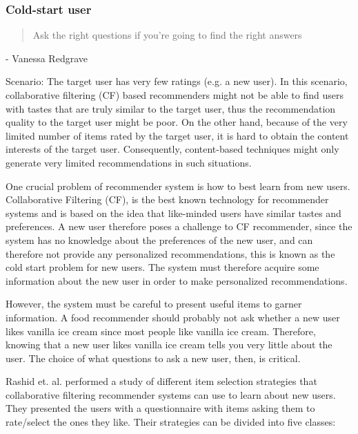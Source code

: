 
\subsubsection{Cold-start user}

\begin{quotation}
Ask the right questions if you're going to find the right answers
\end{quotation}
- Vanessa Redgrave

Scenario: The target user has very few ratings (e.g. a new user). In this
scenario, collaborative filtering (CF) based recommenders might not be able to
find users with tastes that are truly similar to the target user, thus the
recommendation quality to the target user might be poor. On the other hand,
because of the very limited number of items rated by the target user, it is
hard to obtain the content interests of the target user. Consequently,
content-based techniques might only generate very limited recommendations in
such situations.

One crucial problem of recommender system is how to best learn from new users.
Collaborative Filtering (CF), is the best known technology for recommender
systems and is based on the idea that like-minded users have similar tastes and
preferences. A new user therefore poses a challenge to CF recommender, since
the system has no knowledge about the preferences of the new user, and can
therefore not provide any personalized recommendations, this is known as the
cold start problem for new users. The system must therefore acquire some
information about the new user in order to make personalized recommendations.

However, the system must be careful to present useful items to garner
information. A food recommender should probably not ask whether a new user
likes vanilla ice cream since most people like vanilla ice cream. Therefore,
knowing that a new user likes vanilla ice cream tells you very little about the
user. The choice of what questions to ask a new user, then, is critical.

Rashid et. al. \cite{Rashid2002} performed a study of different item selection
strategies that collaborative filtering recommender systems can use to learn
about new users. They presented the users with a questionnaire with items
asking them to rate/select the ones they like. Their strategies can be divided
into five classes:

